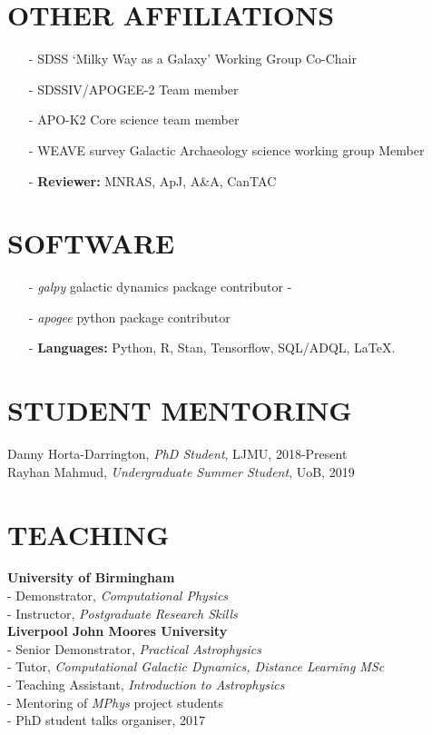 \documentclass[margin]{res}
\begin{document}
\begin{resume}
\section{OTHER AFFILIATIONS}
\begin{itemize}
\item[-] SDSS `Milky Way as a Galaxy' Working Group Co-Chair
\item[-] SDSSIV/APOGEE-2 Team member
\item[-] APO-K2 Core science team member
\item[-] WEAVE survey Galactic Archaeology science working group Member
\item[-] \textbf{Reviewer:} MNRAS, ApJ, A\&A, CanTAC
\end{itemize}

\section{SOFTWARE}
\begin{itemize}
\item[-] \emph{galpy} galactic dynamics package contributor
-\item[-] \emph{apogee} python package contributor
\item[-] \textbf{Languages:} Python, R, Stan, Tensorflow, SQL/ADQL, \LaTeX.
\end{itemize}

\section{STUDENT MENTORING}
Danny Horta-Darrington, \emph{PhD Student}, LJMU, 2018-Present\\
Rayhan Mahmud, \emph{Undergraduate Summer Student}, UoB, 2019

\section{TEACHING}
\textbf{University of Birmingham}\\
- Demonstrator, \emph{Computational Physics}\\
- Instructor, \emph{Postgraduate Research Skills}\\
\textbf{Liverpool John Moores University}\\
- Senior Demonstrator, \emph{Practical Astrophysics}\\
- Tutor, \emph{Computational Galactic Dynamics, Distance Learning MSc}\\
- Teaching Assistant, \emph{Introduction to Astrophysics}\\
- Mentoring of \emph{MPhys} project students\\
- PhD student talks organiser, 2017


\end{resume}
\end{document}
